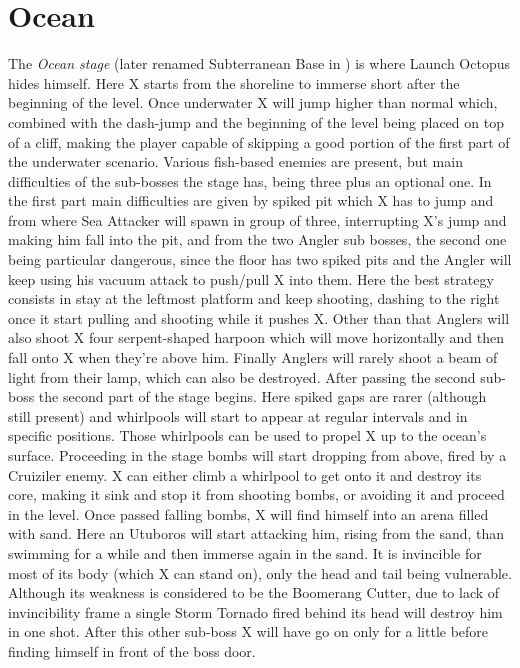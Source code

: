  
 
\section{Ocean}
The \textit{Ocean stage} (later renamed Subterranean Base in \mhx) is where Launch Octopus hides himself. Here X starts from the shoreline to immerse short after the beginning of the level. Once underwater X will jump higher than normal which, combined with the dash-jump and the beginning of the level being placed on top of a cliff, making the player capable of skipping a good portion of the first part of the underwater scenario\cite{stratwiki:Ocean}. Various fish-based enemies are present, but main difficulties of the sub-bosses the stage has, being three plus an optional one. In the first part main difficulties are given by spiked pit which X has to jump and from where Sea Attacker will spawn in group of three, interrupting X's jump and making him fall into the pit, and from the two Angler sub bosses, the second one being particular dangerous, since the floor has two spiked pits and the Angler will keep using his vacuum attack to push/pull X into them. Here the best strategy consists in stay at the leftmost platform and keep shooting, dashing to the right once it start pulling and shooting while it pushes X. Other than that Anglers will also shoot X four serpent-shaped harpoon which will move horizontally and then fall onto X when they're above him. Finally Anglers will rarely shoot a beam of light from their lamp, which can also be destroyed. After passing the second sub-boss the second part of the stage begins. Here spiked gaps are rarer (although still present) and whirlpools will start to appear at regular intervals and in specific positions. Those whirlpools can be used to propel X up to the ocean's surface. Proceeding in the stage bombs will start dropping from above, fired by a Cruiziler enemy. X can either climb a whirlpool to get onto it and destroy its core, making it sink and stop it from shooting bombs, or avoiding it and proceed in the level. Once passed falling bombs, X will find himself into an arena filled with sand. Here an Utuboros will start attacking him, rising from the sand, than swimming for a while and then immerse again in the sand. It is invincible for most of its body (which X can stand on), only the head and tail being vulnerable. Although its weakness is considered to be the Boomerang Cutter, due to lack of invincibility frame a single Storm Tornado fired behind its head will destroy him in one shot\cite{wiki:Utuboros}. After this other sub-boss X will have go on only for a little before finding himself in front of the boss door.
